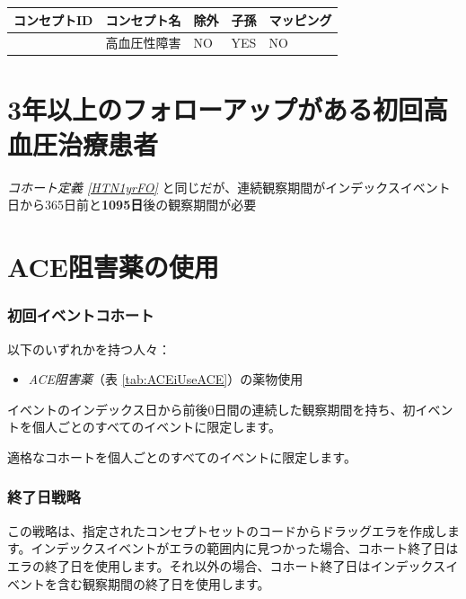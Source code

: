 \documentclass[
  11pt]{book}
\providecommand{\tightlist}{%
  \setlength{\itemsep}{0pt}\setlength{\parskip}{0pt}}
\theoremstyle{definition}
\theoremstyle{definition}
\theoremstyle{definition}
\theoremstyle{definition}
\theoremstyle{remark}
\begin{document}
\begin{longtable}[]{@{}lllll@{}}
\toprule\noalign{}
コンセプトID & コンセプト名 & 除外 & 子孫 & マッピング \\
\midrule\noalign{}
\endhead
\bottomrule\noalign{}
\endlastfoot
316866 & 高血圧性障害 & NO & YES & NO \\
\end{longtable}

\section{3年以上のフォローアップがある初回高血圧治療患者}\label{HTN3yrFO}

\emph{コホート定義 \ref{HTN1yrFO}} と同じだが、連続観察期間がインデックスイベント日から365日前と\textbf{1095日}後の観察期間が必要

\section{ACE阻害薬の使用}\label{ACEiUse}

\subsubsection*{初回イベントコホート}\label{ux521dux56deux30a4ux30d9ux30f3ux30c8ux30b3ux30dbux30fcux30c8-1}

以下のいずれかを持つ人々：

\begin{itemize}
\tightlist
\item
  \emph{ACE阻害薬}（表 \ref{tab:ACEiUseACE}）の薬物使用
\end{itemize}

イベントのインデックス日から前後0日間の連続した観察期間を持ち、初イベントを個人ごとのすべてのイベントに限定します。

適格なコホートを個人ごとのすべてのイベントに限定します。

\subsubsection*{終了日戦略}\label{ux7d42ux4e86ux65e5ux6226ux7565-3}

この戦略は、指定されたコンセプトセットのコードからドラッグエラを作成します。インデックスイベントがエラの範囲内に見つかった場合、コホート終了日はエラの終了日を使用します。それ以外の場合、コホート終了日はインデックスイベントを含む観察期間の終了日を使用します。
\end{document}
